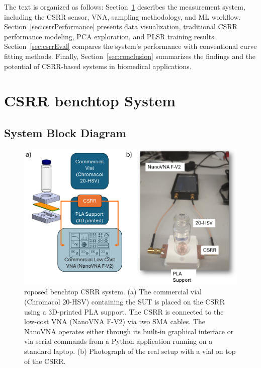 \documentclass[journal,twoside,web]{ieeecolor}
\begin{document}
The text is organized as follows: Section~\ref{sec:csrrbenchTop} describes the measurement system, including the CSRR sensor, VNA, sampling methodology, and ML workflow. Section~\ref{sec:csrrPerformance} presents data visualization, traditional CSRR performance modeling, PCA exploration, and PLSR training results. Section~\ref{sec:csrrEval} compares the system's performance with conventional curve fitting methods. Finally, Section~\ref{sec:conclusion} summarizes the findings and the potential of CSRR-based systems in biomedical applications.

\section{CSRR benchtop System}\label{sec:csrrbenchTop}
\subsection{System Block Diagram}\label{ssec:sysBlockD}

\begin{figure}[!ht]
	\centering
	\includegraphics [trim = 0mm 0mm 0mm 0mm, clip, width=1\columnwidth]{figures/fig1.png}
	\caption{roposed benchtop CSRR system. (a) The commercial vial (Chromacol 20-HSV) containing the SUT is placed on the CSRR using a 3D-printed PLA support. The CSRR is connected to the low-cost VNA (NanoVNA F-V2) via two SMA cables. The NanoVNA operates either through its built-in graphical interface or via serial commands from a Python application running on a standard laptop. (b) Photograph of the real setup with a vial on top of the CSRR.}
	\label{fig:senBlockD}
	\vspace{-0.3cm}
\end{figure}
\end{document}
